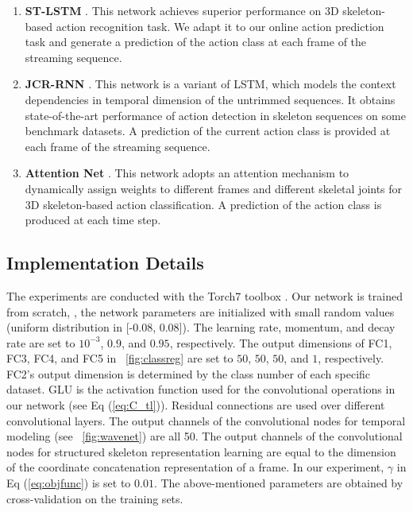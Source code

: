 \documentclass[10pt,twocolumn,letterpaper]{article}
\begin{document}
\begin{enumerate}
  \item
\textbf{ST-LSTM} \cite{liu2017PAMI}.
This network achieves superior performance on 3D skeleton-based action recognition task.
We adapt it to our online action prediction task and generate a prediction of the action class at each frame of the streaming sequence.
\item
\textbf{JCR-RNN} \cite{li2016online}.
This network is a variant of LSTM, which models the context dependencies in temporal dimension of the untrimmed sequences. It obtains state-of-the-art performance of action detection in skeleton sequences on some benchmark datasets.
A prediction of the current action class is provided at each frame of the streaming sequence.
  \item
\textbf{Attention Net} \cite{liu2017global}.
This network adopts an attention mechanism to dynamically assign weights to different frames and different skeletal joints for 3D skeleton-based action classification.
A prediction of the action class is produced at each time step.
\end{enumerate}














\subsection{Implementation Details}








The experiments are conducted with the Torch7 toolbox \cite{collobert2011torch7}.
Our network is trained from scratch,
\ie, the network parameters are initialized with small random values (uniform distribution in [-0.08, 0.08]).
The learning rate, momentum, and decay rate are set to $10^{-3}$, $0.9$, and $0.95$, respectively.
The output dimensions of FC1, FC3, FC4, and FC5 in \figurename{~\ref{fig:classreg}} are set to $50$, $50$, $50$, and $1$, respectively.
FC2's output dimension is determined by the class number of each specific dataset.
GLU \cite{dauphin2016language} is the activation function used for the convolutional operations in our network (see Eq (\ref{eq:C_tl})).
Residual connections \cite{he2016deep} are used over different convolutional layers.
The output channels of the convolutional nodes for temporal modeling (see \figurename{~\ref{fig:wavenet}}) are all 50.
The output channels of the convolutional nodes for structured skeleton representation learning are equal to the dimension of the coordinate concatenation representation of a frame.
In our experiment, $\gamma$ in Eq (\ref{eq:objfunc}) is set to $0.01$.
The above-mentioned parameters are obtained by cross-validation on the training sets.
\end{document}
